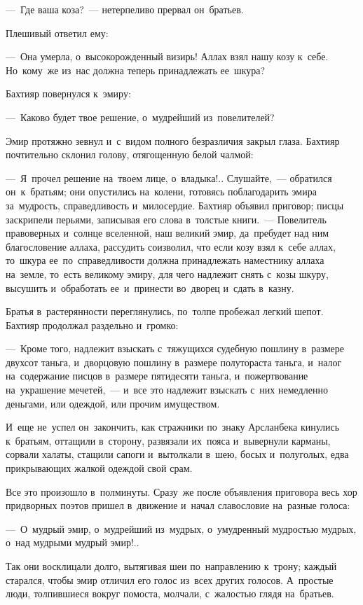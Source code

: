 \documentclass[12pt,a4paper]{book}
\begin{document}
—~Где ваша коза?~— нетерпеливо прервал он~братьев.

Плешивый ответил ему:

—~Она умерла, о~высокорожденный визирь! Аллах взял нашу козу к~себе. Но~кому~же из~нас должна теперь принадлежать ее~шкура?

Бахтияр повернулся к~эмиру:

—~Каково будет твое решение, о~мудрейший из~повелителей?

Эмир протяжно зевнул и~с~видом полного безразличия закрыл глаза. Бахтияр почтительно склонил голову, отягощенную белой чалмой:

—~Я~прочел решение на~твоем лице, о~владыка!.. Слушайте,~— обратился он~к~братьям; они опустились на~колени, готовясь поблагодарить эмира за~мудрость, справедливость и~милосердие. Бахтияр объявил приговор; писцы заскрипели перьями, записывая его слова в~толстые книги.~— Повелитель правоверных и~солнце вселенной, наш великий эмир, да~пребудет над ним благословение аллаха, рассудить соизволил, что если козу взял к~себе аллах, то~шкура ее~по~справедливости должна принадлежать наместнику аллаха на~земле, то~есть великому эмиру, для чего надлежит снять с~козы шкуру, высушить и~обработать ее~и~принести во~дворец и~сдать в~казну.

Братья в~растерянности переглянулись, по~толпе пробежал легкий шепот. Бахтияр продолжал раздельно и~громко:

—~Кроме того, надлежит взыскать с~тяжущихся судебную пошлину в~размере двухсот таньга, и~дворцовую пошлину в~размере полутораста таньга, и~налог на~содержание писцов в~размере пятидесяти таньга, и~пожертвование на~украшение мечетей,~— и~все это надлежит взыскать с~них немедленно деньгами, или одеждой, или прочим имуществом.

И~еще не~успел он~закончить, как стражники по~знаку Арсланбека кинулись к~братьям, оттащили в~сторону, развязали их~пояса и~вывернули карманы, сорвали халаты, стащили сапоги и~вытолкали в~шею, босых и~полуголых, едва прикрывающих жалкой одеждой свой срам.

Все это произошло в~полминуты. Сразу~же после объявления приговора весь хор придворных поэтов пришел в~движение и~начал славословие на~разные голоса:

—~О~мудрый эмир, о~мудрейший из~мудрых, о~умудренный мудростью мудрых, о~над мудрыми мудрый эмир!..

Так они восклицали долго, вытягивая шеи по~направлению к~трону; каждый старался, чтобы эмир отличил его голос из~всех других голосов. А~простые люди, толпившиеся вокруг помоста, молчали, с~жалостью глядя на~братьев.
\end{document}
